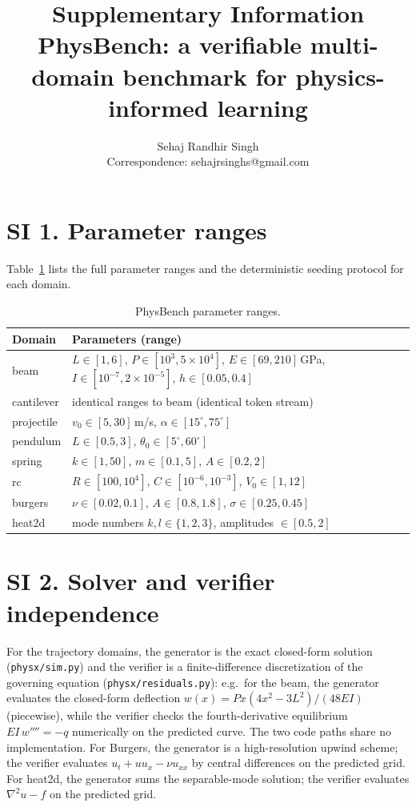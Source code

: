 \documentclass[11pt,a4paper]{article}
\title{\bfseries Supplementary Information\\
PhysBench: a verifiable multi-domain benchmark for physics-informed learning}
\author{Sehaj Randhir Singh \\ \small Correspondence: sehajrsinghs@gmail.com}
\date{}
\begin{document}
\maketitle

\section*{SI 1. Parameter ranges}
\label{si:ranges}

Table~\ref{tab:ranges} lists the full parameter ranges and the deterministic
seeding protocol for each domain.

\begin{table}[h]
\centering
\caption{PhysBench parameter ranges.}
\label{tab:ranges}
\small
\begin{tabular}{@{}ll@{}}
\toprule
Domain & Parameters (range) \\
\midrule
beam & $L\in[1,6]$, $P\in[10^3,5\times10^4]$, $E\in[69,210]$\,GPa, $I\in[10^{-7},2\times10^{-5}]$, $h\in[0.05,0.4]$ \\
cantilever & identical ranges to beam (identical token stream) \\
projectile & $v_0\in[5,30]$\,m/s, $\alpha\in[15^\circ,75^\circ]$ \\
pendulum & $L\in[0.5,3]$, $\theta_0\in[5^\circ,60^\circ]$ \\
spring & $k\in[1,50]$, $m\in[0.1,5]$, $A\in[0.2,2]$ \\
rc & $R\in[100,10^4]$, $C\in[10^{-6},10^{-3}]$, $V_0\in[1,12]$ \\
burgers & $\nu\in[0.02,0.1]$, $A\in[0.8,1.8]$, $\sigma\in[0.25,0.45]$ \\
heat2d & mode numbers $k,l\in\{1,2,3\}$, amplitudes $\in[0.5,2]$ \\
\bottomrule
\end{tabular}
\end{table}

\section*{SI 2. Solver and verifier independence}
\label{si:verifiers}

For the trajectory domains, the generator is the exact closed-form solution
(\texttt{physx/sim.py}) and the verifier is a finite-difference
discretization of the governing equation (\texttt{physx/residuals.py}): e.g.\
for the beam, the generator evaluates the closed-form deflection
$w(x) = Px(4x^2-3L^2)/(48EI)$ (piecewise), while the verifier checks the
fourth-derivative equilibrium $EI\,w'''' = -q$ numerically on the predicted
curve. The two code paths share no implementation. For Burgers, the generator
is a high-resolution upwind scheme; the verifier evaluates
$u_t + uu_x - \nu u_{xx}$ by central differences on the predicted grid. For
heat2d, the generator sums the separable-mode solution; the verifier evaluates
$\nabla^2 u - f$ on the predicted grid.
\end{document}
